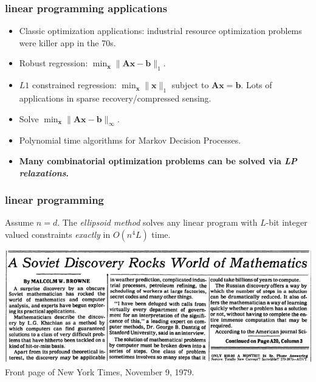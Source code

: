 \documentclass[compress]{beamer}
\newcommand{\bv}[1]{\mathbf{#1}}
\begin{document}
\begin{frame}
		\frametitle{linear programming applications}
	\begin{itemize}
		\item Classic optimization applications: industrial resource optimization problems were killer app in the 70s.
		\item Robust regression: $\min_{\bv{x}} \|\bv{A} \bv{x} - \bv{b}\|_1$. 
		\item $L1$ constrained regression: $\min_{\bv{x}} \|\bv{x}\|_1$ subject to $\bv{A}\bv{x} = \bv{b}$. Lots of applications in sparse recovery/compressed sensing.
		\item Solve $\min_{\bv{x}}\|\bv{A} \bv{x} - \bv{b}\|_{\infty}$.   
		\item Polynomial time algorithms for Markov Decision Processes. 
		\item \alert{\textbf{Many combinatorial optimization problems can be solved via \emph{LP relaxations}.}}
	\end{itemize}
\end{frame}

\begin{frame}[t]
	\frametitle{linear programming}
	\begin{theorem}[Khachiyan, 1979]
	Assume $n=d$. The \emph{ellipsoid method} solves any linear program with $L$-bit integer valued constraints \emph{exactly} in $O(n^4L)$ time. 
	\end{theorem}
	\begin{center}
		\includegraphics[width=\textwidth]{ellipsoidnews.png}
		Front page of New York Times, November 9, 1979.
	\end{center}
\end{frame}
\end{document}
